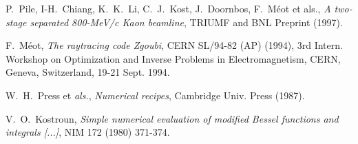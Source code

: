 \begin{thebibliography}{99}
  P.~Pile, I-H.~Chiang, K.~K.~Li, C.~J.~Kost, J.~Doornbos, F.~M\'eot et als., 
\textsl{A two-stage separated 800-MeV/c Kaon beamline}, 
 TRIUMF and BNL Preprint (1997).

 F.~M\'eot, 
\textsl{The raytracing code Zgoubi}, CERN SL/94-82 (AP) (1994), 
3rd Intern. Workshop on Optimization and Inverse Problems 
in Electromagnetism, CERN, Geneva, Switzerland, 19-21 Sept. 1994. 

 W.~H.~Press et {\it als.}, \textsl{Numerical recipes}, Cambridge Univ. Press (1987).  

 V.~O.~Kostroun, 
\textsl{Simple numerical evaluation of modified Bessel functions and integrals [...]}, 
NIM 172 (1980) 371-374. 

\end{thebibliography}

